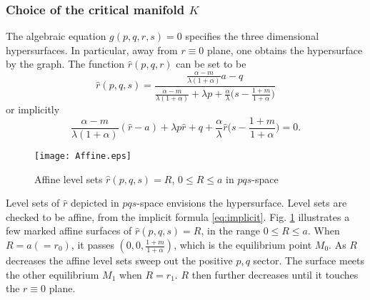 \documentclass[a4paper,11pt]{article}
\theoremstyle{remark}
\begin{document}
\subsubsection{Choice of the critical manifold $K$} \label{sec:choice}


The algebraic equation $g(p,q,r,s)=0$ specifies the three dimensional hypersurfaces. In particular, away from $r\equiv0$ plane, one obtains the hypersurface by the graph. The function $\hat{r}(p,q,r)$ can be set to be
\begin{equation*}
\hat{r}(p,q,s) = \frac{ \frac{\alpha-m}{\lambda(1+\alpha)}a - q }{  \frac{\alpha-m}{\lambda(1+\alpha)} + \lambda p + \frac{\alpha}{\lambda}\big(s- \frac{1+m}{1+\alpha}\big)}
\end{equation*}
or implicitly
\begin{equation}
\frac{\alpha-m}{\lambda(1+\alpha)}(\hat{r}-a) + \lambda p\hat{r} + q +\frac{\alpha}{\lambda}\hat{r}\big(s- \frac{1+m}{1+\alpha}\big)=0. \label{eq:implicit}
\end{equation}

\begin{figure}[ht]
 \centering
%
  \texttt{[image: Affine.eps]}
  \caption{Affine level sets $\hat{r}(p,q,s)=R$, $0\le R\le a$  in $pqs$-space} \label{fig:affine}
\end{figure}

Level sets of $\hat{r}$ depicted in $pqs$-space envisions the hypersurface. Level sets are checked to be affine, from the implicit formula \eqref{eq:implicit}. Fig. \ref{fig:affine} illustrates a few marked affine surfaces of $\hat{r}(p,q,s)=R$, in the range $0\le R\le a$. When $R=a(=r_0)$, it passes $\left(0,0,\tfrac{1+m}{1+\alpha}\right)$, which is the equilibrium point $M_0$. As $R$ decreases the affine level sets sweep out the positive $p,q$ sector. The surface meets the other equilibrium $M_1$ when $R=r_1$. $R$ then further decreases until it touches the $r\equiv0$ plane.
\end{document}
